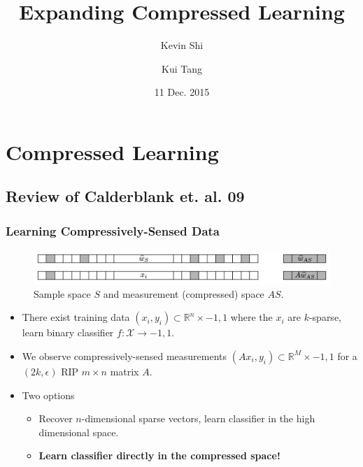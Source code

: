 \documentclass[aspectratio=34]{beamer}
\title{Expanding Compressed Learning}
\author{Kevin Shi \and Kui Tang}
\institute{Columbia University}
\date{11 Dec. 2015}
\theoremstyle{plain}
\begin{document}
\frame{\titlepage}


\section{Compressed Learning}

\subsection{Review of Calderblank et. al. 09}

\begin{frame}
\frametitle{Learning Compressively-Sensed Data}
\begin{figure}
    \includegraphics[width=\columnwidth]{S_vs_AS.pdf}
    \caption{\label{fig:S_vs_AS}Sample space $S$ and measurement (compressed) space $AS$.}
\end{figure}
\begin{itemize}
    \item There exist training data ${(x_i,y_i)} \subset \mathbb{R}^n \times {-1,1}$ where the $x_i$ are $k$-sparse, learn binary classifier $f : \mathcal{X} \rightarrow {-1,1}$.
    \item We observe compressively-sensed measurements ${(Ax_i,y_i)} \subset \mathbb{R}^M \times {-1, 1}$ for a $(2k,\epsilon)$ RIP $m \times n$ matrix $A$.
    \item Two options
    \begin{itemize}
        \item Recover $n$-dimensional sparse vectors, learn classifier in the high dimensional space.
        \item \textbf{Learn classifier directly in the compressed space!}
    \end{itemize}
\end{itemize}
\end{frame}
\end{document}
